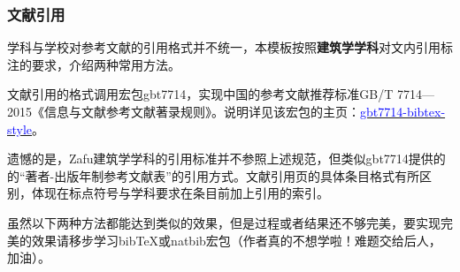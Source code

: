 \documentclass[AutoFakeBold]{ZafuThesis}
\begin{document}
\subsubsection{文献引用}
学科与学校对参考文献的引用格式并不统一，本模板按照\textbf{建筑学学科}对文内引用标注的要求，介绍两种常用方法。\par
文献引用的格式调用宏包gbt7714，实现中国的参考文献推荐标准GB/T 7714—2015《信息与文献参考文献著录规则》。说明详见该宏包的主页：\href{https://github.com/zepinglee/gbt7714-bibtex-style}{\textcolor{blue}{gbt7714-bibtex-style}}。\par
遗憾的是，Zafu建筑学学科的引用标准并不参照上述规范，但类似gbt7714提供的的“著者-出版年制参考文献表”的引用方式。文献引用页的具体条目格式有所区别，体现在标点符号与学科要求在条目前加上引用的索引。\par
虽然以下两种方法都能达到类似的效果，但是过程或者结果还不够完美，要实现完美的效果请移步学习bibTeX或natbib宏包（作者真的不想学啦！难题交给后人，加油）。
\end{document}
